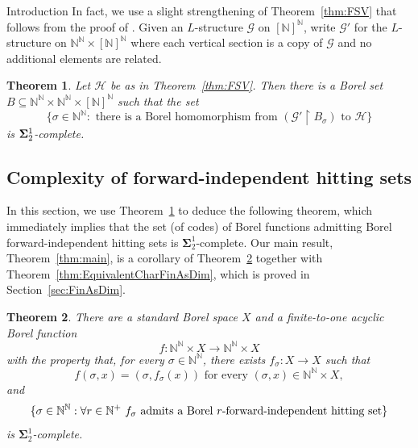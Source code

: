 \documentclass[psamsfonts]{amsart}
\newtheorem{thm}{Theorem}[section]
\theoremstyle{definition}
\newcommand{\N}{\mathbb N}
\theoremstyle{remark}
\numberwithin{equation}{section}
\newcommand{\rest}{\restriction}
\newcommand\mbf{\mathbf}
\newcommand\mcal{\mathcal}
\begin{document}
\begin{section}{Introduction}
In fact, we use a slight strengthening of Theorem~\ref{thm:FSV} that follows from the proof of \cite[Theorem~3.1]{fsv2024}.
Given an $L$-structure $\mathcal{G}$ on $[\mathbb{N}]^\mathbb{N}$, write $\mathcal{G}'$ for the $L$-structure on $\N^{\mathbb{N}}\times [\mathbb{N}]^\mathbb{N}$ where each vertical section is a copy of $\mathcal{G}$ and no additional elements are related.

\begin{thm}\label{thm:FSVversionTwo}
    Let $\mathcal{H}$ be as in Theorem~\ref{thm:FSV}.
    Then there is a Borel set $B\subseteq \mathbb{N}^\mathbb{N}\times \mathbb{N}^\mathbb{N}\times [\mathbb{N}]^\mathbb{N}$ such that the set
   \begin{equation*}
        \{\sigma\in \N^\N: \text{ there is a Borel homomorphism from } (\mcal{G}' \rest B_{\sigma}) \text{ to } \mcal{H} \}
    \end{equation*}
    is ${\bf \Sigma}^1_2$-complete.
\end{thm}


\section{Complexity of forward-independent hitting sets}
\label{sec:Complexity}

In this section, we use Theorem~\ref{thm:FSVversionTwo} to deduce the following theorem, which immediately implies that the set (of codes) of Borel functions admitting Borel forward-independent hitting sets is $\mbf{\Sigma}^1_2$-complete.
Our main result, Theorem~\ref{thm:main}, is a corollary of Theorem~\ref{thm:ComplexityFIH} together with Theorem~\ref{thm:EquivalentCharFinAsDim}, which is proved in Section~\ref{sec:FinAsDim}.

\begin{thm}\label{thm:ComplexityFIH}
    There are a standard Borel space $X$ and a finite-to-one acyclic Borel function
    $$f:\mathbb{N}^\mathbb{N}\times X\to \mathbb{N}^\mathbb{N}\times X$$
    with the property that, for every $\sigma\in \mathbb{N}^\mathbb{N}$, there exists $f_\sigma: X\to X$ such that $$f(\sigma,x)=(\sigma,f_\sigma(x)) \text{ for every } (\sigma,x)\in \mathbb{N}^\mathbb{N}\times X,$$
    and
\begin{equation}\label{eq:AllComplete}
    \{\sigma\in \mathbb{N}^\mathbb{N}: \forall r\in \mathbb{N}^+ \ f_\sigma \ \text{\normalfont admits a Borel } r \text{\normalfont-forward-independent hitting set} \}
\end{equation}
is $\mbf{\Sigma}^1_2$-complete.


\end{thm}
\end{section}
\end{document}
